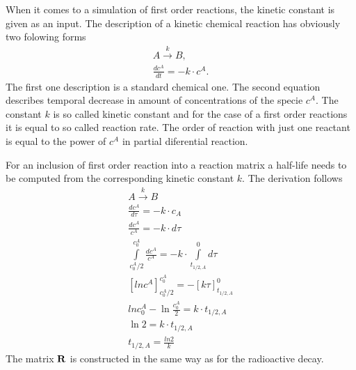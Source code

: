 When it comes to a simulation of first order reactions, the kinetic constant is given as an input. 
The description of a kinetic chemical reaction has obviously two folowing forms
\[
  \begin{array}{l}
    A\xrightarrow{k}B,\\
    \frac{dc^A}{dt} = -k \cdot c^A.
  \end{array}
\]
The first one description is a standard chemical one. The second equation describes temporal decrease in amount of concentrations of the specie $c^A$. The constant $k$ is so called kinetic constant and for the case of a first order reactions it is equal to so called reaction rate. The order of reaction with just one reactant is equal to the power of $c^A$ in partial diferential reaction.

For an inclusion of first order reaction into a reaction matrix a half-life needs to be computed from the corresponding kinetic constant $k$. The derivation follows
\[
  \begin{array}{l}
    A\xrightarrow{k} B\\
    \frac{dc^A}{d\tau} = -k\cdot c_A\\
    \frac{dc^A}{c^A} = -k\cdot d\tau\\
    \int\limits_{c^A_0/2}^{c^A_0}\frac{dc^A}{c^A} = -k\cdot\int\limits_{t_{1/2,A}}^{0} d\tau\\
    \left[ ln c^A\right]_{c^A_0/2}^{c^A_0} = -[k\tau]_{t_{1/2,A}}^{0}\\
    ln c^A_0 - \ln\frac{c^A_0}{2} = k\cdot t_{1/2,A}\\
    \ln 2 = k \cdot t_{1/2,A}\\
    t_{1/2,A} = \frac{ln 2}{k}
  \end{array}                                                                                                                                                                                                                                                                                                            
\]
The matrix ${\bf R}$ is constructed in the same way as for the radioactive
decay.
